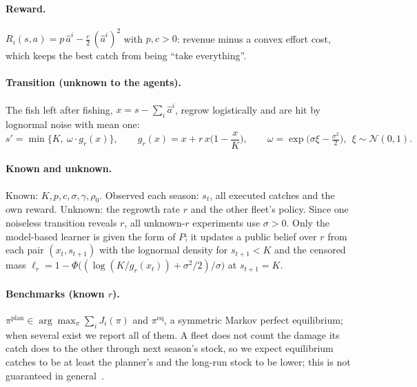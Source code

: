 \documentclass{article}
\begin{document}
\paragraph{Reward.} $R_i(s,a)=p\,\hat a^i-\frac{c}{2}\,(\hat a^i)^2$ with $p,c>0$: revenue minus a convex effort cost, which keeps the best catch from being ``take everything''.

\paragraph{Transition (unknown to the agents).} The fish left after fishing, $x=s-\sum_i \hat a^i$, regrow logistically and are hit by lognormal noise with mean one:
\begin{equation}
s'=\min\Big\{K,\ \omega\cdot g_r(x)\Big\},\qquad g_r(x)=x+r\,x\Big(1-\frac{x}{K}\Big),\qquad \omega=\exp\big(\sigma\xi-\tfrac{\sigma^2}{2}\big),\ \ \xi\sim\mathcal N(0,1).
\end{equation}

\paragraph{Known and unknown.} Known: $K,p,c,\sigma,\gamma,\rho_0$. Observed each season: $s_t$, all executed catches and the own reward. Unknown: the regrowth rate $r$ and the other fleet's policy. Since one noiseless transition reveals $r$, all unknown-$r$ experiments use $\sigma>0$. Only the model-based learner is given the form of $P$; it updates a public belief over $r$ from each pair $(x_t,s_{t+1})$ with the lognormal density for $s_{t+1}<K$ and the censored mass $\ell_r=1-\Phi\big((\log(K/g_r(x_t))+\sigma^2/2)/\sigma\big)$ at $s_{t+1}=K$.

\paragraph{Benchmarks (known $r$).} $\pi^{\mathrm{plan}}\in\arg\max_{\pi}\sum_i J_i(\pi)$ and $\pi^{\mathrm{eq}}$, a symmetric Markov perfect equilibrium; when several exist we report all of them. A fleet does not count the damage its catch does to the other through next season's stock, so we expect equilibrium catches to be at least the planner's and the long-run stock to be lower; this is not guaranteed in general~\cite{dutta1993}.
\end{document}
